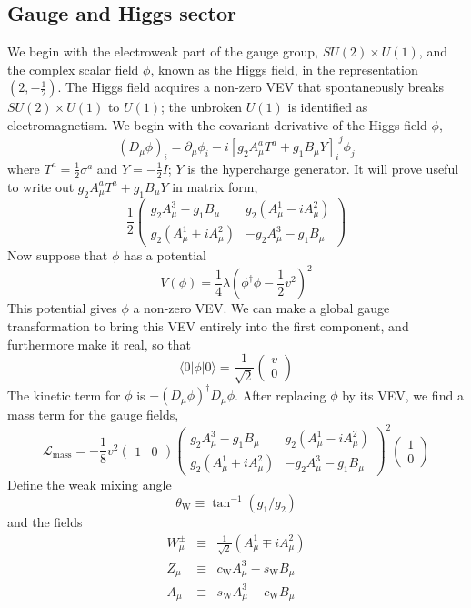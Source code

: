\subsection{Gauge and Higgs sector}
We begin with the electroweak part of the gauge group, $SU(2)\times U(1)$, and the complex scalar field $\phi$, known as the Higgs field, in the representation $(2,-\frac{1}{2})$. The Higgs field acquires a non-zero VEV that spontaneously breaks $SU(2)\times U(1)$ to $U(1)$; the unbroken $U(1)$ is identified as electromagnetism.
We begin with the covariant derivative of the Higgs field $\phi$,
\[(D_{\mu}\phi)_i = \partial_{\mu}\phi_i - i[g_2 A^a_{\mu}T^a + g_1B_{\mu}Y]_{i}^{\phantom{i}j} \phi_j\] where $T^a = \frac{1}{2}\sigma^a$ and $Y = -\frac{1}{2}I$; $Y$ is the hypercharge generator. It will prove
useful to write out $g_2 A^a_{\mu}T^a + g_1B_{\mu}Y$ in matrix form,
\[ \frac{1}{2} \begin{pmatrix}
g_2A^3_{\mu}-g_1B_{\mu} & g_2(A^1_{\mu} - iA^2_{\mu}) \\
g_2(A^1_{\mu} + iA^2_{\mu}) & -g_2A^3_{\mu}-g_1B_{\mu}
\end{pmatrix}\]
Now suppose that $\phi$ has a potential
\[V(\phi) = \frac{1}{4}\lambda (\phi^{\dagger}\phi - \frac{1}{2}v^2)^2\]
This potential gives $\phi$ a non-zero VEV. We can make a global gauge transformation to bring this VEV entirely into the first component, and furthermore make it real, so that
\[\langle 0 | \phi | 0 \rangle =  \frac{1}{\sqrt{2}}\begin{pmatrix}
v \\ 0
\end{pmatrix} \]
The kinetic term for $\phi$ is $-(D_{\mu}\phi)^{\dagger}D_{\mu}\phi$. After replacing $\phi$ by its VEV, we find a mass term for the gauge fields,
\[\mathcal{L}_{\mathrm{mass}}  = - \frac{1}{8}v^2 \begin{pmatrix}
1 & 0 \end{pmatrix} \begin{pmatrix}
g_2A^3_{\mu}-g_1B_{\mu} & g_2(A^1_{\mu} - iA^2_{\mu}) \\
g_2(A^1_{\mu} + iA^2_{\mu}) & -g_2A^3_{\mu}-g_1B_{\mu}
\end{pmatrix}^2 \begin{pmatrix} 1 \\ 0 \end{pmatrix} \]
Define the weak mixing angle
\[\theta_{\mathrm{W}} \equiv \tan^{-1}(g_1/g_2)\]
and the fields
\begin{eqnarray}
W^{\pm}_{\mu} &\equiv & \frac{1}{\sqrt{2}} (A^1_{\mu} \mp iA^2_{\mu}) \nonumber \\
Z_{\mu}  &\equiv & c_{\mathrm{W}} A^3_{\mu} - s_{\mathrm{W}} B_{\mu} \nonumber \\
A_{\mu}  &\equiv & s_{\mathrm{W}} A^3_{\mu} + c_{\mathrm{W}} B_{\mu} \nonumber
\end{eqnarray}
